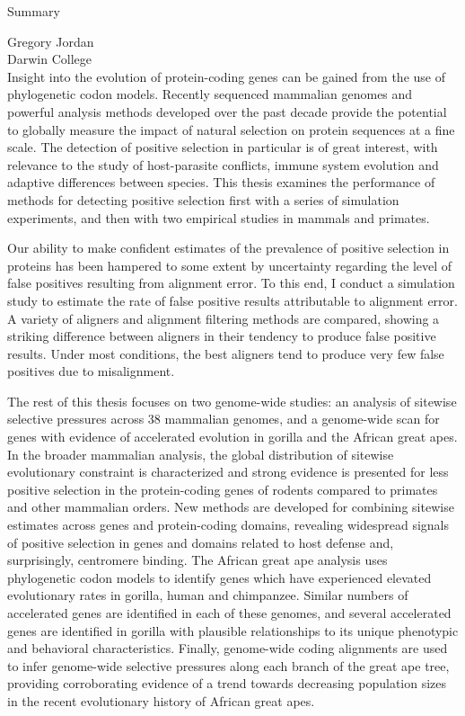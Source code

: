 \begin{center}
\Large \mytitle

\large Summary
\end{center}

\hfill Gregory Jordan \\
\noindent{\today} \hfill Darwin College \\

Insight into the evolution of protein-coding genes can be gained from
the use of phylogenetic codon models. Recently sequenced mammalian
genomes and powerful analysis methods developed over the past decade
provide the potential to globally measure the impact of natural
selection on protein sequences at a fine scale. The detection of
positive selection in particular is of great interest, with relevance
to the study of host-parasite conflicts, immune system evolution and
adaptive differences between species. This thesis examines the
performance of methods for detecting positive selection first with a
series of simulation experiments, and then with two empirical studies
in mammals and primates.

Our ability to make confident estimates of the prevalence of positive
selection in proteins has been hampered to some extent by uncertainty
regarding the level of false positives resulting from alignment
error. To this end, I conduct a simulation study to estimate the rate
of false positive results attributable to alignment error. A variety
of aligners and alignment filtering methods are compared, showing a
striking difference between aligners in their tendency to produce
false positive results. Under most conditions, the best aligners tend
to produce very few false positives due to misalignment.

The rest of this thesis focuses on two genome-wide studies: an
analysis of sitewise selective pressures across 38 mammalian genomes,
and a genome-wide scan for genes with evidence of accelerated
evolution in gorilla and the African great apes. In the broader
mammalian analysis, the global distribution of sitewise evolutionary
constraint is characterized and strong evidence is presented for less
positive selection in the protein-coding genes of rodents compared to
primates and other mammalian orders. New methods are developed for
combining sitewise estimates across genes and protein-coding domains,
revealing widespread signals of positive selection in genes and
domains related to host defense and, surprisingly, centromere
binding. The African great ape analysis uses phylogenetic codon models
to identify genes which have experienced elevated evolutionary rates
in gorilla, human and chimpanzee. Similar numbers of accelerated genes
are identified in each of these genomes, and several accelerated genes
are identified in gorilla with plausible relationships to its unique
phenotypic and behavioral characteristics. Finally, genome-wide coding
alignments are used to infer genome-wide selective pressures along
each branch of the great ape tree, providing corroborating evidence of
a trend towards decreasing population sizes in the recent evolutionary
history of African great apes.
